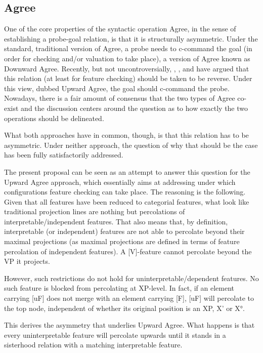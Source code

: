 \documentclass[output=paper
,modfonts
,nonflat]{langsci/langscibook}
\begin{document}
\subsection{Agree}
One of the core properties of the syntactic operation Agree, in the sense of establishing a probe-goal relation, is that it is structurally asymmetric. Under the standard, traditional version of Agree, a probe needs to c-command the goal (in order for checking and/or valuation to take place), a version of Agree known as Downward Agree. Recently, but not uncontroversially, \citet{Wurmbrand2012a, Wurmbrand2012}, \citet{Zeijlstra2012}, and \citet{Bjorkman_ZeijlstraTA} have argued that this relation (at least for feature checking) should be taken to be reverse. Under this view, dubbed Upward Agree, the goal should c-command the probe. Nowadays, there is a fair amount of consensus that the two types of Agree co-exist and the discussion centers around the question as to how exactly the two operations should be delineated.

What both approaches have in common, though, is that this relation has to be asymmetric. Under neither approach, the question of why that should be the case has been fully satisfactorily addressed. 

The present proposal can be seen as an attempt to answer this question for the Upward Agree approach, which essentially aims at addressing under which configurations feature checking can take place. The reasoning is the following. Given that all features have been reduced to categorial features, what look like traditional projection lines are nothing but percolations of interpretable\slash independent features. That also means that, by definition, interpretable (or independent) features are not able to percolate beyond their maximal projections (as maximal projections are defined in terms of feature percolation of independent features). A [V]-feature cannot percolate beyond the VP it projects.

However, such restrictions do not hold for uninterpretable\slash dependent features. No such feature is blocked from percolating at XP-level. In fact, if an element carrying [uF] does not merge with an element carrying [F], [uF] will percolate to the top node, independent of whether its original position is an XP, X’ or X°. 

This derives the asymmetry that underlies Upward Agree. What happens is that every uninterpretable feature will percolate upwards until it stands in a sisterhood relation with a matching interpretable feature. 
\end{document}

